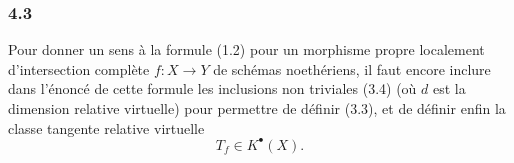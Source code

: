\subsubsection*{4.3}
Pour donner un sens \`a la formule (1.2) pour un morphisme propre localement d'intersection compl\`ete $f:X\to Y$ de sch\'emas noeth\'eriens, il faut encore inclure dans l'\'enonc\'e de cette formule les inclusions non triviales (3.4) (o\`u $d$ est la dimension relative virtuelle) pour permettre de d\'efinir (3.3), et de d\'efinir enfin la classe tangente relative virtuelle
\[
T_f\in K^\bullet(X).
\]
